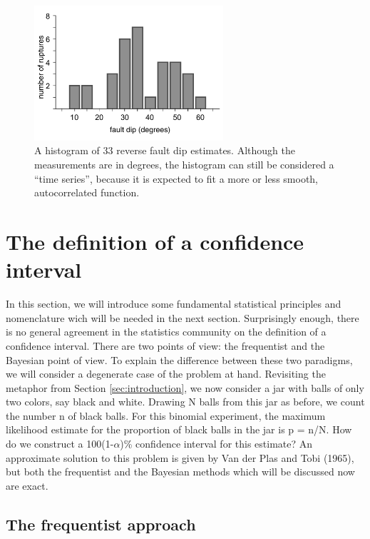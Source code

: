 \documentclass{article}
\begin{document}
\begin{figure}[h]
  \centering
  \includegraphics[width=7cm]{CollettiniHist.pdf}
  \caption{A histogram of 33 reverse fault dip estimates. Although the measurements
are  in  degrees, the  histogram  can  still  be considered  a  ``time
series'',  because  it is  expected  to fit  a  more  or less  smooth,
autocorrelated function.}
  \label{fig:CollettiniHist}
\end{figure}

\clearpage

\section{The definition of a confidence interval}\label{sec:independentCI}

In  this  section,  we  will introduce  some  fundamental  statistical
principles and nomenclature  wich will be needed in  the next section.
Surprisingly enough,  there is no general agreement  in the statistics
community on the  definition of a confidence interval.   There are two
points of  view: the frequentist and  the Bayesian point  of view.  To
explain the difference between these two paradigms, we will consider a
degenerate case of  the problem at hand. Revisiting  the metaphor from
Section \ref{sec:introduction},  we now consider  a jar with  balls of
only two colors,  say black and white.  Drawing N  balls from this jar
as before,  we count the number  n of black balls.   For this binomial
experiment,  the maximum  likelihood  estimate for  the proportion  of
black  balls  in  the  jar  is  p  =  n/N.   How  do  we  construct  a
100(1-$\alpha$)\%   confidence  interval   for   this  estimate?    An
approximate solution to this problem is given by Van der Plas and Tobi
(1965), but both  the frequentist and the Bayesian  methods which will
be discussed now are exact.

\subsection{The frequentist approach}\label{sec:frequentist2D}
\end{document}
